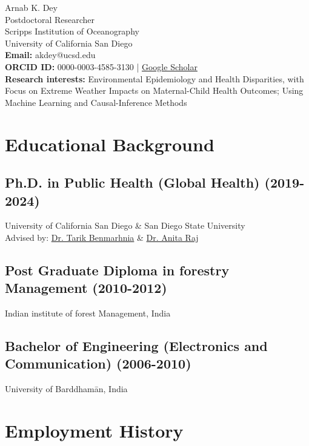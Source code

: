 \documentclass[11pt,letterpaper]{article}
\author{Arnab Dey}
\date{\today}
\title{}
\begin{document}
\begin{center}
{\LARGE Arnab K. Dey} \\
\vspace{0.5em}
Postdoctoral Researcher\\
Scripps Institution of Oceanography\\
University of California San Diego\\

\vspace{0.5em}
\textbf{Email:} akdey@ucsd.edu\\
\textbf{ORCID ID:} 0000-0003-4585-3130 | \href{https://scholar.google.com/citations?user=iHzQ2QUAAAAJ\&hl=en\&oi=ao}{Google Scholar} \\
\vspace{0.5em}
\textbf{Research interests:} Environmental Epidemiology and Health Disparities, with Focus on Extreme Weather Impacts on Maternal-Child Health Outcomes; Using Machine Learning and Causal-Inference Methods
\end{center}
\section*{Educational Background}
\label{sec:orga85aae9}

\subsection*{Ph.D. in Public Health (Global Health) (2019-2024)}
\label{sec:org604f734}
University of California San Diego \& San Diego State University \vspace{0.3em}\\
Advised by: \href{https://profiles.ucsd.edu/Tarik.Benmarhnia}{Dr. Tarik Benmarhnia} \& \href{https://newcomb.tulane.edu/anita\_raj}{Dr. Anita Raj} 
\subsection*{Post Graduate Diploma in forestry Management (2010-2012)}
\label{sec:org64423c9}
Indian institute of forest Management, India
\subsection*{Bachelor of Engineering (Electronics and Communication) (2006-2010)}
\label{sec:orgb5485e2}
University of Barddhamān, India
\section*{Employment History}
\label{sec:orga640209}
\end{document}
